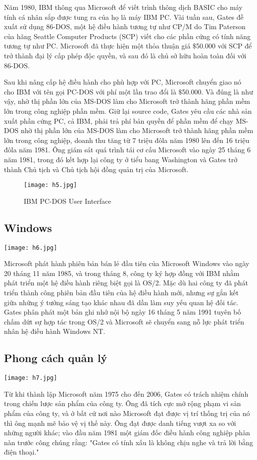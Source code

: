 \documentclass[12pt,a4paper]{article}  %
\begin{document}
	\noindent
	Năm 1980, IBM thông qua Microsoft để viết trình thông dịch BASIC cho máy tính cá nhân sắp được tung ra của họ là máy IBM PC. Vài tuần sau, Gates đề xuất sử dụng 86-DOS, một hệ điều hành tương tự như CP/M do Tim Paterson của hãng Seattle Computer Products (SCP) viết cho các phần cứng có tính năng tương tự như PC. Microsoft đã thực hiện một thỏa thuận giá \(\$ \)50.000 với SCP để trở thành đại lý cấp phép độc quyền, và sau đó là chủ sở hữu hoàn toàn đối với 86-DOS.
	
	\noindent
	Sau khi nâng cấp hệ điều hành cho phù hợp với PC, Microsoft chuyển giao nó cho IBM với tên gọi PC-DOS với phí một lần trao đổi là \(\$ \)50.000. Và đúng là như vậy, nhờ thị phần lớn của MS-DOS làm cho Microsoft trở thành hãng phần mềm lớn trong công nghiệp phần mềm. Giữ lại source code, Gates yêu cầu các nhà sản xuất phần cứng PC, cả IBM, phải trả phí bản quyền để phần mềm để chạy MS-DOS nhờ thị phần lớn của MS-DOS làm cho Microsoft trở thành hãng phần mềm lớn trong công nghiệp, doanh thu tăng từ 7 triệu đôla năm 1980 lên đến 16 triệu đôla năm 1981. Ông giám sát quá trình tái cơ cấu Microsoft vào ngày 25 tháng 6 năm 1981, trong đó kết hợp lại công ty ở tiểu bang Washington và Gates trở thành Chủ tịch và Chủ tịch hội đồng quản trị của Microsoft. 
	\begin{figure}[h!]
		\centering
		\texttt{[image: h5.jpg]}
		\captionsetup{labelformat=empty}
		\caption{IBM PC-DOS User Interface}
	\end{figure}
	
	\subsection{Windows}
	\begin{center}
		\texttt{[image: h6.jpg]}
	\end{center}
	Microsoft phát hành phiên bản bán lẻ đầu tiên của Microsoft Windows vào ngày 20 tháng 11 năm 1985, và trong tháng 8, công ty ký hợp đồng với IBM nhằm phát triển một hệ điều hành riêng biệt gọi là OS/2. Mặc dù hai công ty đã phát triển thành công phiên bản đầu tiên của hệ điều hành mới, nhưng sự gắn kết giữa những ý tưởng sáng tạo khác nhau đã dần làm suy yếu quan hệ đối tác. Gates phân phát một bản ghi nhớ nội bộ ngày 16 tháng 5 năm 1991 tuyên bố chấm dứt sự hợp tác trong OS/2 và Microsoft sẽ chuyển sang nỗ lực phát triển nhân hệ điều hành Windows NT.
	\subsection{Phong cách quản lý}
	\begin{center}
		\texttt{[image: h7.jpg]}
	\end{center}
	Từ khi thành lập Microsoft năm 1975 cho đến 2006, Gates có trách nhiệm chính trong chiến lược sản phẩm của công ty. Ông đã tích cực mở rộng phạm vi sản phẩm của công ty, và ở bất cứ nơi nào Microsoft đạt được vị trí thống trị của nó thì ông mạnh mẽ bảo vệ vị thế này. Ông đạt được danh tiếng vượt xa so với những người khác; vào đầu năm 1981 một giám đốc điều hành công nghiệp phàn nàn trước công chúng rằng: "Gates có tính xấu là không chịu nghe và trả lời bằng điện thoại."
	
\end{document}

